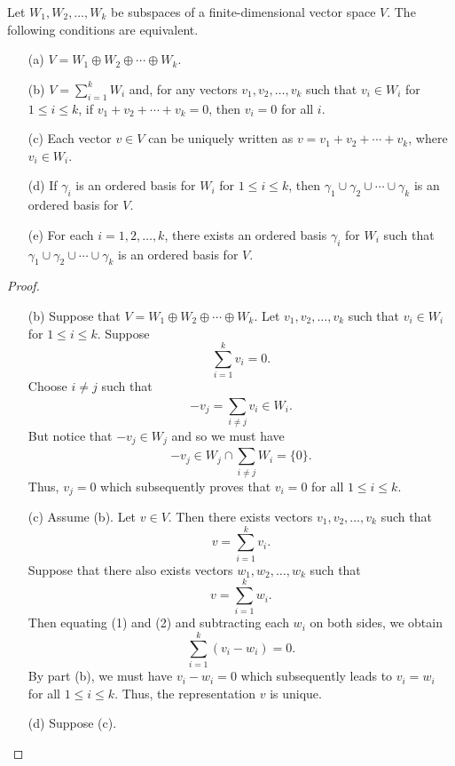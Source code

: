 \begin{theorem}
    Let \( {W}_{1}, {W}_{2}, \dots, {W}_{k} \) be subspaces of a finite-dimensional vector space \( V  \). The following conditions are equivalent. 
    \begin{enumerate}
        \item[(a)] \( V = {W}_{1} \oplus {W}_{2} \oplus \cdots \oplus {W}_{k}  \).
        \item[(b)] \( V = \sum_{ i = 1  }^{ k  } {W}_{i}  \) and, for any vectors       \( {v}_{1}, {v}_{2}, \dots, {v}_{k } \) such that \( {v}_{i} \in {W}_{i} \) for \( 1 \leq i \leq k  \), if \( {v}_{1} + {v}_{2} + \cdots + {v}_{k } = 0  \), then \( {v}_{i} = 0  \) for all \( i \).
        \item[(c)] Each vector \( v \in V  \) can be uniquely written as \( v = {v}_{1} + {v}_{2} + \cdots + {v}_{k } \), where \( {v}_{i} \in {W}_{i} \).
        \item[(d)] If \( {\gamma}_{i} \) is an ordered basis for \( {W}_{i}  \) for \( 1 \leq i \leq k  \), then \( {\gamma}_{1} \cup {\gamma}_{2} \cup \cdots \cup {\gamma}_{k}  \) is an ordered basis for \( V  \).
        \item[(e)] For each \( i = 1, 2 , \dots, k  \), there exists an ordered basis \({\gamma}_{i} \) for \( {W}_{i} \) such that \( {\gamma}_{1} \cup {\gamma}_{2} \cup \cdots \cup {\gamma}_{k} \) is an ordered basis for \( V  \).
    \end{enumerate}
\end{theorem}
\begin{proof}
\begin{enumerate}
    \item[(b)] Suppose that \( V = {W}_{1} \oplus {W}_{2} \oplus \cdots \oplus {W}_{k}   \). Let \( {v}_{1}, {v}_{2}, \dots, {v}_{k } \) such that \( {v}_{i} \in {W}_{i} \) for \( 1 \leq i \leq k  \). Suppose 
        \[  \sum_{ i=1  }^{ k  } {v}_{i} = 0. \]
         Choose \( i \neq j  \) such that 
        \[  -{v}_{j} = \sum_{ i \neq j }^{  } {v}_{i} \in {W}_{i}.  \]
        But notice that \( -{v}_{j} \in {W}_{j} \) and so we must have
        \[  {-v}_{j} \in {W}_{j} \cap \sum_{ i \neq j  }^{  }{W}_{i} = \{ 0  \}. \]
        Thus, \( {v}_{j} = 0  \) which subsequently proves that \( {v}_{i} = 0  \) for all \( 1 \leq i \leq k  \).
    \item[(c)] Assume (b). Let \( v \in V  \). Then there exists vectors \( {v}_{1}, {v}_{2}, \dots, {v}_{k} \) such that 
        \[  v = \sum_{ i=1  }^{ k  } {v}_{i}. \tag{1} \]
    Suppose that there also exists vectors \( {w}_{1}, {w}_{2}, \dots, {w}_{k } \) such that
    \[  v = \sum_{ i=1  }^{ k  } {w}_{i}. \tag{2} \]
    Then equating (1) and (2) and subtracting each \( {w}_{i}  \) on both sides, we obtain
    \[  \sum_{ i=1  }^{ k  } ({v}_{i} - {w}_{i}) = 0.   \]
    By part (b), we must have \( {v}_{i} - {w}_{i} = 0  \) which subsequently leads to \( {v}_{i} = {w}_{i} \) for all \( 1 \leq i \leq k  \). Thus, the representation \( v  \) is unique.
    \item[(d)] Suppose (c). 
\end{enumerate}
\end{proof}


